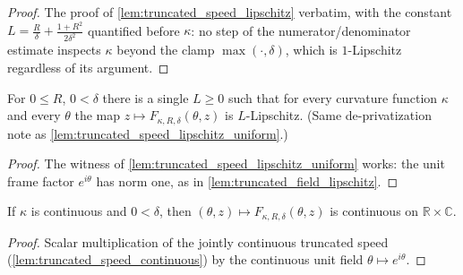\begin{proof}
  \leanok
  The proof of \cref{lem:truncated_speed_lipschitz} verbatim, with the constant
  $L=\tfrac{R}{\delta}+\tfrac{1+R^2}{2\delta^2}$ quantified before $\kappa$:
  no step of the numerator/denominator estimate inspects $\kappa$ beyond the
  clamp $\max(\cdot,\delta)$, which is $1$-Lipschitz regardless of its argument.
\end{proof}

\begin{lemma}
  \label{lem:truncated_field_lipschitz_uniform}
  For $0\le R$, $0<\delta$ there is a single $L\ge0$ such that for every
  curvature function $\kappa$ and every $\theta$ the map
  $z\mapsto F_{\kappa,R,\delta}(\theta,z)$ is $L$-Lipschitz. (Same
  de-privatization note as \cref{lem:truncated_speed_lipschitz_uniform}.)
\end{lemma}

\begin{proof}
  \leanok
  The witness of \cref{lem:truncated_speed_lipschitz_uniform} works: the unit
  frame factor $e^{i\theta}$ has norm one, as in
  \cref{lem:truncated_field_lipschitz}.
\end{proof}

\begin{lemma}
  \label{lem:truncated_field_continuous}
  If $\kappa$ is continuous and $0<\delta$, then
  $(\theta,z)\mapsto F_{\kappa,R,\delta}(\theta,z)$ is continuous on
  $\mathbb R\times\mathbb C$.
\end{lemma}

\begin{proof}

\leanok
  Scalar multiplication of the jointly continuous truncated speed
  (\cref{lem:truncated_speed_continuous}) by the continuous unit field
  $\theta\mapsto e^{i\theta}$.
\end{proof}


